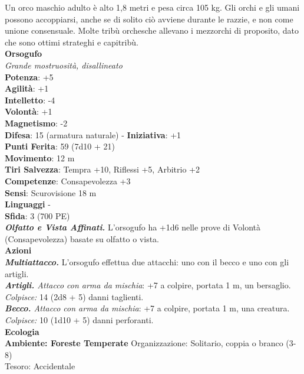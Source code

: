 \begin{multicols}{2}
Un orco maschio adulto è alto 1,8 metri e pesa circa 105 kg. Gli orchi e gli umani possono accoppiarsi, anche se di solito ciò avviene durante le razzie, e non come unione consensuale. Molte tribù orchesche allevano i mezzorchi di proposito, dato che sono ottimi strateghi e capitribù.\\


\medskip\textbf{Orsogufo}\\
\emph{Grande mostruosità, disallineato}\\
\textbf{Potenza}: +5\\
\textbf{Agilità}: +1\\
\textbf{Intelletto}: -4\\
\textbf{Volontà}: +1\\
\textbf{Magnetismo}: -2\\
\textbf{Difesa}: 15 (armatura naturale) - \textbf{Iniziativa}: +1\\
\textbf{Punti Ferita}: 59 (7d10 + 21)\\
\textbf{Movimento}: 12 m\\
\textbf{Tiri Salvezza}: Tempra +10, Riflessi +5, Arbitrio +2\\
\textbf{Competenze}: Consapevolezza +3\\
\textbf{Sensi}: Scurovisione 18 m\\
\textbf{Linguaggi} -\\
\textbf{Sfida}: 3 (700 PE)\smallskip\\
\emph{\textbf{Olfatto e Vista Affinati.}} L'orsogufo ha +1d6 nelle prove di Volontà (Consapevolezza) basate su olfatto o vista.\\
\smallskip\textbf{Azioni}\\
\emph{\textbf{Multiattacco.}} L'orsogufo effettua due attacchi: uno con il becco e uno con gli artigli.\\
\emph{\textbf{Artigli.} Attacco con arma da mischia}: +7 a colpire, portata 1 m, un bersaglio.\\
\emph{Colpisce:} 14 (2d8 + 5) danni taglienti.\\
\emph{\textbf{Becco.} Attacco con arma da mischia}: +7 a colpire, portata 1 m, una creatura.\\
\emph{Colpisce:} 10 (1d10 + 5) danni perforanti.\\
\textbf{Ecologia}\\
\textbf{Ambiente: Foreste Temperate}
Organizzazione: Solitario, coppia o branco (3-8)\\
Tesoro: Accidentale\\

\end{multicols}
